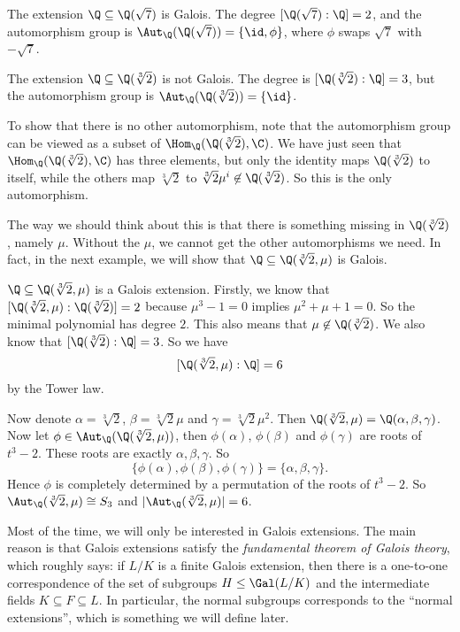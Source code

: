 \documentclass[a4paper]{article}
\begin{document}
\begin{eg}
  The extension $\Q\subseteq \Q(\sqrt{7})$ is Galois. The degree $[\Q(\sqrt{7}):\Q] = 2$, and the automorphism group is $\Aut_\Q(\Q(\sqrt{7})) = \{\id, \phi\}$, where $\phi$ swaps $\sqrt{7}$ with $-\sqrt{7}$.
\end{eg}

\begin{eg}
  The extension $\Q\subseteq \Q(\sqrt[3]{2})$ is not Galois. The degree is $[\Q(\sqrt[3]{2}):\Q] = 3$, but the automorphism group is $\Aut_\Q(\Q(\sqrt[3]{2})) = \{\id\}$.

  To show that there is no other automorphism, note that the automorphism group can be viewed as a subset of $\Hom_\Q(\Q(\sqrt[3]{2}), \C)$. We have just seen that $\Hom_\Q(\Q(\sqrt[3]{2}), \C)$ has three elements, but only the identity maps $\Q(\sqrt[3]{2})$ to itself, while the others map $\sqrt[3]{2}$ to $\sqrt[3]{2}\mu^i \not\in \Q(\sqrt[3]{2})$. So this is the only automorphism.

  The way we should think about this is that there is something missing in $\Q(\sqrt[3]{2})$, namely $\mu$. Without the $\mu$, we cannot get the other automorphisms we need. In fact, in the next example, we will show that $\Q\subseteq \Q(\sqrt[3]{2}, \mu)$ is Galois.
\end{eg}

\begin{eg}
  $\Q\subseteq \Q(\sqrt[3]{2},\mu)$ is a Galois extension. Firstly, we know that $[\Q(\sqrt[3]{2}, \mu): \Q(\sqrt[3]{2})] = 2$ because $\mu^3 - 1 = 0$ implies $\mu^2 + \mu + 1 = 0$. So the minimal polynomial has degree $2$. This also means that $\mu \not\in \Q(\sqrt[3]{2})$. We also know that $[\Q(\sqrt[3]{2}): \Q] = 3$. So we have
  \[
    [\Q(\sqrt[3]{2}, \mu): \Q] = 6
  \]
  by the Tower law.

  Now denote $\alpha = \sqrt[3]{2}$, $\beta = \sqrt[3]{2}\mu$ and $\gamma = \sqrt[3]{2}\mu^2$. Then $\Q(\sqrt[3]{2}, \mu) = \Q(\alpha, \beta, \gamma)$. Now let $\phi \in \Aut_\Q(\Q(\sqrt[3]{2}, \mu))$, then $\phi(\alpha)$, $\phi(\beta)$ and $\phi(\gamma)$ are roots of $t^3 - 2$. These roots are exactly $\alpha, \beta, \gamma$. So
  \[
    \{\phi(\alpha), \phi(\beta), \phi(\gamma)\} = \{\alpha, \beta, \gamma\}.
  \]
  Hence $\phi$ is completely determined by a permutation of the roots of $t^3 - 2$. So $\Aut_\Q(\sqrt[3]{2}, \mu) \cong S_3$ and $|\Aut_\Q(\sqrt[3]{2}, \mu)| = 6$.
\end{eg}

Most of the time, we will only be interested in Galois extensions. The main reason is that Galois extensions satisfy the \emph{fundamental theorem of Galois theory}, which roughly says: if $L/K$ is a finite Galois extension, then there is a one-to-one correspondence of the set of subgroups $H\leq \Gal(L/K)$ and the intermediate fields $K\subseteq F \subseteq L$. In particular, the normal subgroups corresponds to the ``normal extensions'', which is something we will define later.
\end{document}
